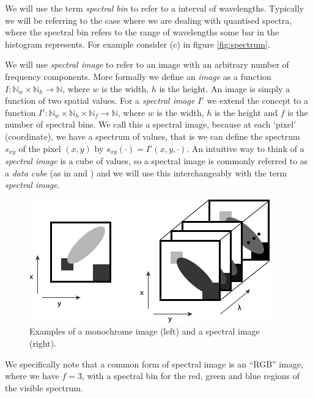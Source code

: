\documentclass[12pt,twoside,notitlepage]{report}
\newcommand{\bb}[1]{\mathbb{#1}}
\begin{document}
        We will use the term \textit{spectral bin} to refer to a interval of wavelengths. Typically we will be referring 
        to the case where we are dealing with quantised spectra, where the spectral bin refers to the range of 
        wavelengths some bar in the histogram represents. For example consider (c) in figure \ref{fig:spectrum}.

        We will use \textit{spectral image} to refer to an image with an arbitrary number of frequency components. More 
        formally we define an \textit{image} as a function $I : \bb{N}_w \times \bb{N}_h \rightarrow \bb{N}$, 
        where $w$ is the width, $h$ is the height. An image 
        is simply a function of two spatial values. For a \textit{spectral image} $I'$ we extend the concept to a 
        function $I' : \bb{N}_w \times \bb{N}_h \times \bb{N}_f \rightarrow \bb{N}$, where $w$ is the width, 
        $h$ is the height and $f$ is the number of spectral bins. We call this a spectral image, because at each `pixel' 
        (coordinate), we have a spectrum of values, that is we can define the spectrum $s_{xy}$ of the pixel $(x,y)$ by
        $s_{xy}(\cdot) = I'(x,y,\cdot)$. An intuitive way to think of a \textit{spectral image} is a cube of values, so 
        a spectral image is commonly referred to as a \textit{data cube} (as in \cite{Qingli:2013:spectralImagingTech} 
        and \cite{Bioucas-Dias:2012:unmixingOverview}) and we will use this interchangeably with the term 
        \textit{spectral image}.

        \begin{figure}[H]
            \centering
            \includegraphics[scale=1.0]{spectral_image}
            \caption{Examples of a monochrome image (left) and a spectral image (right).}
        \end{figure}

        We specifically note that a common form of spectral image is an ``RGB'' image, where we have $f=3$, with a 
        spectral bin for the red, green and blue regions of the visible spectrum.
\end{document}
